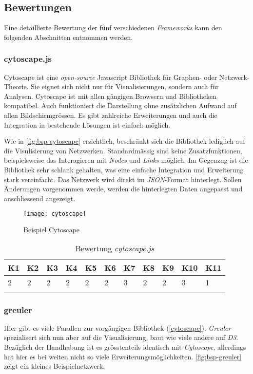 \subsection{Bewertungen}\label{Bewertungen}
Eine detaillierte Bewertung der fünf verschiedenen \textit{Frameworks} kann den folgenden Abschnitten entnommen werden.

\subsubsection{cytoscape.js}
\label{cytoscape}
Cytoscape ist eine \textit{open-source} Javascript Bibliothek für Graphen- oder Netzwerk-Theorie. Sie eignet sich nicht nur für Visualisierungen, sondern auch für Analysen. Cytoscape ist mit allen gängigen Browsern und Bibliotheken kompatibel. Auch funktioniert die Darstellung ohne zusätzlichen Aufwand auf allen Bildschirmgrössen. Es gibt zahlreiche Erweiterungen und auch die Integration in bestehende Lösungen ist einfach möglich. \cite{1_franz_lopes_huck_dong_sumer_bader_2016}

Wie in \autoref{fig:bsp-cytoscape} ersichtlich, beschränkt sich die Bibliothek lediglich auf die Visulisierung von Netzwerken. Standardmässig sind keine Zusatzfunktionen, beispielsweise das Interagieren mit \textit{Nodes} und \textit{Links} möglich. Im Gegenzug ist die Bibliothek sehr schlank gehalten, was eine einfache Integration und Erweiterung stark vereinfacht. Das Netzwerk wird direkt im \textit{JSON}-Format hinterlegt. Sollen Änderungen vorgenommen werde, werden die hinterlegten Daten angepasst und anschliessend angezeigt.

\begin{figure}[htbp]
\centering
\texttt{[image: cytoscape]}
\caption{Beispiel Cytoscape}
\label{fig:bsp-cytoscape}
\end{figure}


\begin{longtable}{|p{0.5cm}|p{0.5cm}|p{0.5cm}|p{0.5cm}|p{0.5cm}|p{0.5cm}|p{0.5cm}|p{0.5cm}|p{0.5cm}|p{0.7cm}|p{0.7cm}|}
  \hline
    K1 & K2 & K3 & K4 & K5 & K6 & K7 & K8 & K9 & K10 & K11 \\\hline
    2 & 2 & 2 & 2 & 2 & 2 & 3 & 2 & 2 & 3 & 1\\\hline
    \caption{Bewertung  \textit{cytoscape.js}}
  \label{tab:bewertung-cytoscape}
\end{longtable}

\subsubsection{greuler}
Hier gibt es viele Parallen zur vorgängigen Bibliothek (\autoref{cytoscape}). \textit{Greuler} spezialisert sich nun aber auf die Visualisierung, baut wie viele andere auf \textit{D3}. Bezüglich der Handhabung ist es grösstenteils identisch mit \textit{Cytoscape}, allerdings hat hier es bei weiten nicht so viele Erweiterungsmöglichkeiten. \autoref{fig:bsp-greuler} zeigt ein kleines Beispielnetzwerk. \cite{2_maurizzzio/greuler_2016}


